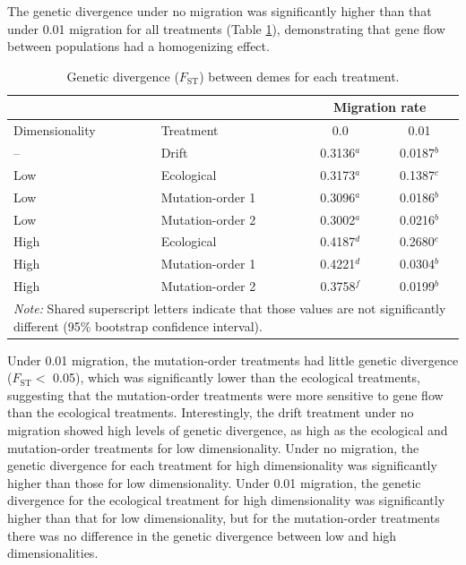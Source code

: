 \begin{doublespace}
The genetic divergence under no migration was significantly higher
than that under 0.01 migration for all treatments (Table \ref{tbl_fst}),
demonstrating that gene flow between populations had a homogenizing effect.
%
\begin{table}
\centering
\begin{tabular}{llcc}
\cline{3-4}
  & & \multicolumn{2}{c}{Migration rate} \\
\hline
Dimensionality & Treatment & 0.0 & 0.01 \\
\hline
--  & Drift            & 0.3136$^{a}$ & 0.0187$^{b}$ \\
\hline
Low & Ecological       & 0.3173$^{a}$ & 0.1387$^{c}$ \\
Low & Mutation-order 1 & 0.3096$^{a}$ & 0.0186$^{b}$ \\
Low & Mutation-order 2 & 0.3002$^{a}$ & 0.0216$^{b}$ \\
\hline
High & Ecological       & 0.4187$^{d}$ & 0.2680$^{e}$ \\
High & Mutation-order 1 & 0.4221$^{d}$ & 0.0304$^{b}$ \\
High & Mutation-order 2 & 0.3758$^{f}$ & 0.0199$^{b}$ \\
\hline
\multicolumn{4}{p{4in}}{\small\emph{Note:} Shared superscript letters indicate
  that those values are not significantly different
  (95\% bootstrap confidence interval).}
\end{tabular}
\caption{Genetic divergence ($F_{\mathrm{ST}}$)
  between demes for each treatment.}
\label{tbl_fst}
\end{table}
%
Under 0.01 migration, the mutation-order treatments had little genetic
divergence ($F_{\mathrm{ST}} <$ 0.05), which was significantly lower than the
ecological treatments, suggesting that the mutation-order treatments were more
sensitive to gene flow than the ecological treatments.
%
Interestingly, the drift treatment under no migration showed high levels of
genetic divergence, as high as the ecological and mutation-order treatments for
low dimensionality.
%
Under no migration, the genetic divergence for each treatment for high
dimensionality was significantly higher than those for low dimensionality.
%
Under 0.01 migration, the genetic divergence for the ecological treatment for
high dimensionality was significantly higher than that for low dimensionality,
but for the mutation-order treatments there was no difference in the genetic
divergence between low and high dimensionalities.




\end{doublespace}
